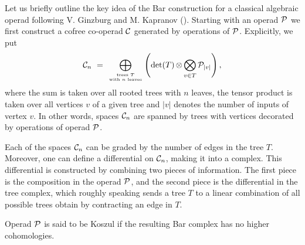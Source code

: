 \documentclass[letterpaper,12pt,leqno]{article}
\numberwithin{equation}{theorem}
\begin{document}
\begin{nparagraph}[Koszulity.]
Let us briefly outline the key idea of the Bar construction for a classical algebraic operad following V. Ginzburg and M. Kapranov (\cite{Ginzburg-Kapranov}). Starting with an operad $\mathcal{P}$
we first construct a cofree co-operad $\mathcal{C}$ generated by operations of $\mathcal{P}$. Explicitly, we put
$$
\mathcal{C}_n \ =\ \bigoplus_{\text{trees }T \atop \text{with $n$ leaves}} \left(\det(T) \mathop{\otimes}\limits \bigotimes_{v \in T} \mathcal{P}_{|v|} \right),
$$
where the sum is taken over all rooted trees with $n$ leaves, the tensor product is taken over all vertices $v$ of a given tree and $|v|$ denotes the number of inputs of vertex $v$.
In other words, spaces $\mathcal{C}_n$ are spanned by trees with vertices decorated by operations of operad $\mathcal{P}$.

Each of the spaces $\mathcal{C}_n$ can be graded by the number of edges in the tree $T$. Moreover, one can define a differential on $\mathcal{C}_n$, making it into a complex. This differential is constructed
by combining two pieces of information. The first piece is the composition in the operad $\mathcal{P}$, and the second piece is the differential in the tree complex, which roughly speaking sends a tree
$T$ to a linear combination of all possible trees obtain by contracting an edge in $T$.

Operad $\mathcal{P}$ is said to be Koszul if the resulting Bar complex has no higher cohomologies.
\end{nparagraph}
\end{document}
